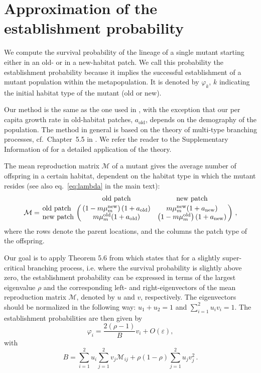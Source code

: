 \documentclass[11pt]{article}
\begin{document}
\section{Approximation of the establishment probability\label{sec:approxestabproba}}
We compute the survival probability of the lineage of a single mutant starting either in an old- or in a new-habitat patch. We call this probability the establishment probability because it implies the successful establishment of a mutant population within the metapopulation. It is denoted by $\varphi_k$, $k$ indicating the initial habitat type of the mutant (old or new).

Our method is the same as the one used in \citet{tomasini_2018}, with the exception that our per capita growth rate in old-habitat patches, $a_{\text{old}}$, depends on the demography of the population. The method in general is based on the theory of multi-type branching processes, cf.~Chapter~5.5 in \citet{haccou_book}. We refer the reader to the Supplementary Information of \citet{tomasini_2018} for a detailed application of the theory. 

The mean reproduction matrix $\mathcal{M}$ of a mutant gives the average number of offspring in a certain habitat, dependent on the habitat type in which the mutant resides (see also eq.~\eqref{eq:lambda} in the main text):
\begin{equation}\label{Seq:mean_repro}
\mathcal{M} = \bordermatrix{ ~ & \text{old patch} & \text{new patch} \cr
	\text{old patch} & \left(1 - m \mu_m^{\text{new}} \right) (1+a_{\text{old}}) & m \mu_m^{\text{new}} (1+a_{\text{new}}) \cr
	\text{new patch} & m \mu_m^{\text{old}} (1+a_{\text{old}}) & \left(1 - m \mu_m^{\text{old}}\right) (1+a_{\text{new}})
}\ ,
\end{equation}
where the rows denote the parent locations, and the columns the patch type of the offspring.

Our goal is to apply Theorem 5.6 from \citet{haccou_book} which states that for a slightly super-critical branching process, i.e. where the survival probability is slightly above zero, the establishment probability can be expressed in terms of the largest eigenvalue $\rho$ and the corresponding left- and right-eigenvectors of the mean reproduction matrix $\mathcal{M}$, denoted by $u$ and $v$, respectively. The eigenvectors should be normalized in the following way: $u_1+u_2 = 1$ and $\sum_{i=1}^2 u_i v_i = 1$. The establishment probabilities are then given by 
\begin{equation}\label{Seq:theory}
\varphi_i = \frac{2(\rho-1)}{B} v_i + O(\varepsilon), 
\end{equation}
with
\begin{equation} 
B = \sum_{i=1}^2 u_i \sum_{j=1}^2 v_j \mathcal{M}_{ij} + \rho(1-\rho) \sum_{j=1}^2 u_j v_j^2\, . 
\end{equation} 
\end{document}
